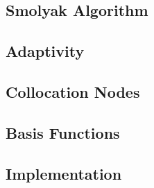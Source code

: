 \subsection{Smolyak Algorithm} 


\subsection{Adaptivity} 


\subsection{Collocation Nodes} 


\subsection{Basis Functions} 


\subsection{Implementation}

